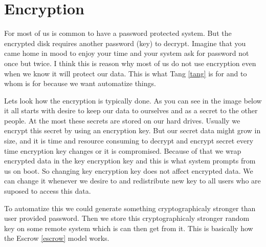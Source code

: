 \documentclass[../xdudla00-porting-Tang-to-Open-WRT.tex]{subfiles}
\begin{document}
\chapter{Encryption}\label{encryption}

For most of us is common to have a password protected system.
But the encrypted disk requires another password (key) to decrypt.
Imagine that you came home in mood to enjoy your time and your system ask for password not once but twice.
I think this is reason why most of us do not use encryption even when we know it will protect our data.
This is what Tang \ref{tang} is for and to whom is for because we want automatize things.

Lets look how the encryption is typically done. As you can see in the image below it all starts with desire to keep our data to ourselves and as a secret to the other people.
At the most these secrets are stored on our hard drives. Usually we encrypt this secret by using an encryption key.
But our secret data might grow in size, and it is time and resource consuming to decrypt and encrypt secret every time encryption key changes or it is compromised.
Because of that we wrap encrypted data in the key encryption key and this is what system prompts from us on boot.
So changing key encryption key does not affect encrypted data. We can change it whenever we desire to and redistribute new key to all users who are suposed to access this data.


To automatize this we could generate something cryptographicaly stronger than user provided password.
Then we store this cryptographicaly stronger random key on some remote system which is can then get from it.
This is basically how the Escrow \ref{escrow} model works.
\end{document}
